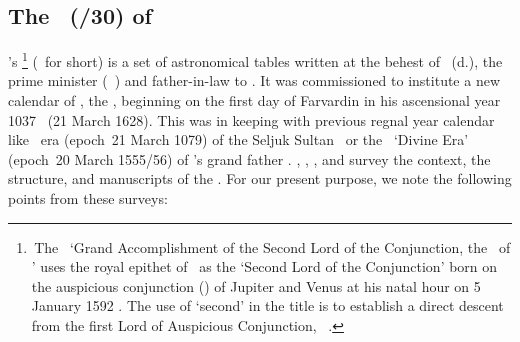 \subsection{The \ZijiShahJahani\ (/30) of \MullaFarid}\label{zijshahjahani_mulla_farid}

\MullaFarid's \ZijiShahJahanifull\thinspace\footnote{\,The \ZijiShahJahanifull\ `Grand Accomplishment of the Second Lord of the Conjunction, the \Zij\ of \Shahjahan' uses the royal epithet of \Shahjahan\ as the `Second Lord of the Conjunction' born on the auspicious conjunction (\qiran) of Jupiter and Venus at his natal hour on 5 January 1592 \ce. The use of `second' in the title is to establish a direct descent from the first Lord of Auspicious Conjunction, \Timur\ \parencite[1105--1106]{Chann}.} (\ZijiShahJahani\ for short) is a set of astronomical tables written at the behest of \AsafKhan\ (d.), the prime minister (\vazir\idafaconsonant\ \azam) and father-in-law to \Shahjahan. It was commissioned to institute a new calendar of \Shahjahan, the \Shahishani, beginning on the first day of Farvardin in his ascensional year 1037 \ah\ (21 March 1628). This was in keeping with previous regnal year calendar like \Jalali\ era (epoch~21 March 1079) of the Seljuk Sultan \MalikShah\ or the \Ilahi\ `Divine Era' (epoch~20 March 1555/56) of \Shahjahan's grand father \Akbar. \textcite[Section~3.2 on pp.583--585]{Ansarisurvey}, \textcite[34--36]{Ghori}, \textcite[357--358]{RosenfeldandIhsanoglu}, and \textcite[307]{STMI} survey the context, the structure, and manuscripts of the \ZijiShahJahani. For our present purpose, we note the following points from these surveys:
